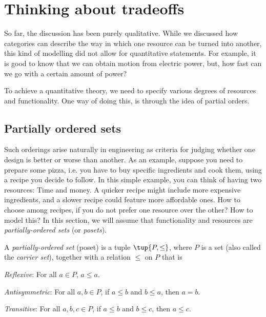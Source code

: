 \section{Thinking about tradeoffs}
So far, the discussion has been purely qualitative. While we discussed how
categories can describe the way in which one resource can be turned into another,
this kind of modelling did not allow for quantitative statements. For example, it
is good to know that we can obtain motion from electric power, but, how fast can
we go with a certain amount of power?

To achieve a quantitative theory, we need to specify various degrees of resources and functionality.
One way of doing this, is through the idea of partial orders.

\subsection{Partially ordered sets}

Such orderings arise naturally in engineering as criteria for judging whether one design is better or worse than another. As an example, suppose you need to prepare some pizza, i.e. you have to buy specific ingredients and cook them, using a recipe you decide to follow. In this simple example, you can think of having two resources: Time and money. A quicker recipe might include more expensive ingredients, and a slower recipe could feature more affordable ones. How to choose among recipes, if you do not prefer one resource over the other? How to model this? In this section, we will assume that functionality and resources
are \emph{partially-ordered sets} (or \emph{posets}).

\begin{definition}
\label{def:poset}
    A \emph{partially-ordered set} (poset) is a tuple $ \tup{P, \leq}$,
where $P$ is a set (also called the \emph{carrier set}), together with a
relation $\leq$ on $P$ that is
\begin{compactenum}
    \item \emph{Reflexive}: For all $a\in P$, $a\leq a$.
    \item \emph{Antisymmetric}: For all $a,b\in P$, if $a\leq b$ and $b\leq a$, then $a=b$.
    \item \emph{Transitive}: For all $a,b,c\in P$, if $a\leq b$ and $b\leq c$, then $a\leq c$.
\end{compactenum}
\end{definition}

